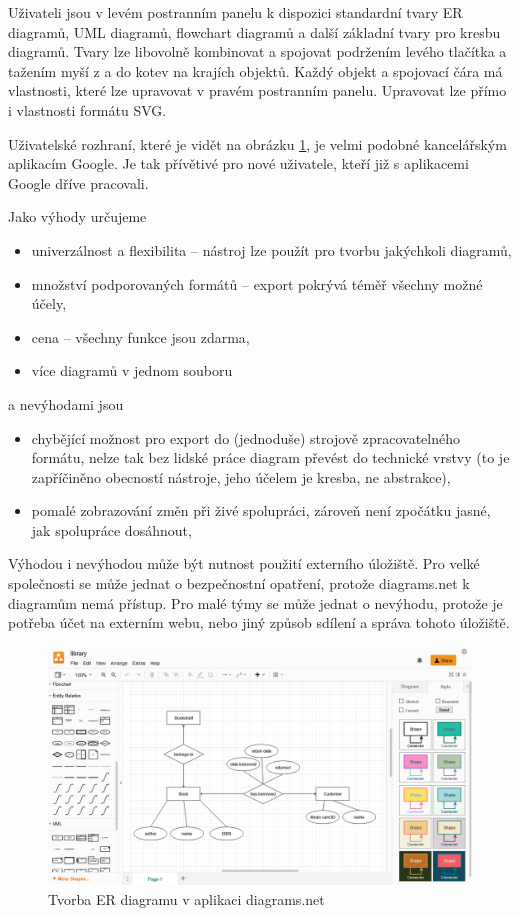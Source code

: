 Uživateli jsou v levém postranním panelu k dispozici standardní tvary ER
diagramů, UML diagramů, flowchart diagramů a další základní tvary pro kresbu
diagramů. Tvary lze libovolně kombinovat a spojovat podržením levého tlačítka a
tažením myší z a do kotev na krajích objektů. Každý objekt a spojovací čára má
vlastnosti, které lze upravovat v pravém postranním panelu. Upravovat lze přímo
i vlastnosti formátu SVG.

Uživatelské rozhraní, které je vidět na obrázku \ref{fig:diagrams.net}, je velmi
podobné kancelářským aplikacím Google. Je tak přívětivé pro nové uživatele,
kteří již s aplikacemi Google dříve pracovali.

Jako výhody určujeme
\begin{itemize}
  \item univerzálnost a flexibilita -- nástroj lze použít pro tvorbu jakýchkoli
  diagramů,
  \item množství podporovaných formátů -- export pokrývá téměř všechny možné
  účely,
  \item cena -- všechny funkce jsou zdarma,
  \item více diagramů v jednom souboru
\end{itemize}
a nevýhodami jsou
\begin{itemize}
  \item chybějící možnost pro export do (jednoduše) strojově zpracovatelného
  formátu, nelze tak bez lidské práce diagram převést do technické vrstvy (to je
  zapříčiněno obecností nástroje, jeho účelem je kresba, ne abstrakce),
  \item pomalé zobrazování změn při živé spolupráci, zároveň není zpočátku
  jasné, jak spolupráce dosáhnout,
\end{itemize}

Výhodou i nevýhodou může být nutnost použití externího úložiště. Pro velké
společnosti se může jednat o bezpečnostní opatření, protože diagrams.net k
diagramům nemá přístup. Pro malé týmy se může jednat o nevýhodu, protože je
potřeba účet na externím webu, nebo jiný způsob sdílení a správa tohoto
úložiště.

\begin{figure}
  \centering
  \includegraphics[width=\textwidth]{../img/diagrams.net.png}
  \caption{Tvorba ER diagramu v aplikaci diagrams.net}
  \label{fig:diagrams.net}
\end{figure}

